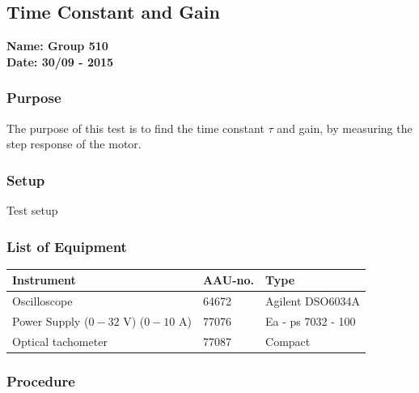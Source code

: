 \pagebreak
\subsection{Time Constant and Gain} %
\textbf{Name: Group 510}\\
\textbf{Date: 30/09 - 2015}

\subsubsection{Purpose}
The purpose of this test is to find the time constant $\tau$ and gain, by measuring the step response of the motor.

\subsubsection{Setup}
Test setup

\subsubsection{List of Equipment}

\begin{table}[H]
\begin{tabular}{|l|l|p{4cm}|}
\hline%
  \textbf{Instrument}                        &  \textbf{AAU-no.}  &  \textbf{Type}       \\
\hline%
  Oscilloscope                               &  64672             &  Agilent DSO6034A    \\
\hline%
  Power Supply ($0 - 32$ V) ($0 - 10$ A)     &  77076             &  Ea - ps 7032 - 100  \\
\hline%
  Optical tachometer                         &  77087             &  Compact             \\
\hline%
\end{tabular}
\end{table}

\subsubsection{Procedure}

